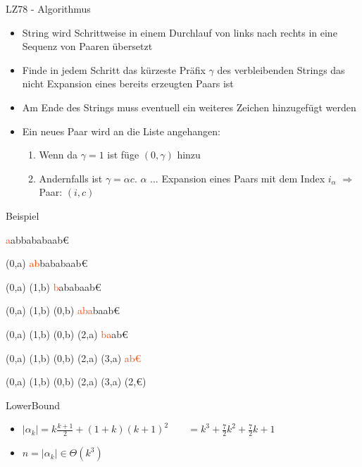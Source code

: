 \begin{frame}{\FrameName}
\begin{block}{LZ78 - Algorithmus}
	\begin{itemize}[<+->]
		\item String wird Schrittweise in einem Durchlauf von links nach rechts in eine Sequenz von Paaren übersetzt
		\item Finde in jedem Schritt das kürzeste Präfix $\gamma$ des verbleibenden Strings das nicht Expansion eines bereits erzeugten Paars ist
		\item Am Ende des Strings muss eventuell ein weiteres Zeichen hinzugefügt werden
		\item Ein neues Paar wird an die Liste angehangen:
		\begin{enumerate}
			\item<4-> Wenn da $\gamma = 1$ ist füge $(0,\gamma)$ hinzu
			\item<5-> Andernfalls ist $\gamma = \alpha c$. \linebreak $\alpha$ ... Expansion eines Paars mit dem Index $i_\alpha$ \linebreak $\Rightarrow$ Paar: $(i,c)$
		\end{enumerate}
	\end{itemize}
\end{block}
\end{frame}

\newcommand{\M}[1]{\textcolor{OrangeRed}{#1}}

\begin{frame}{\FrameName}
\begin{block}{Beispiel}
	\begin{description}[<+->]
		\item \M{a}abbababaab\euro
		\item (0,a) \M{ab}bababaab\euro
		\item (0,a) (1,b) \M{b}ababaab\euro
		\item (0,a) (1,b) (0,b) \M{aba}baab\euro
		\item (0,a) (1,b) (0,b) (2,a) \M{ba}ab\euro
		\item (0,a) (1,b) (0,b) (2,a) (3,a) \M{ab\euro}
		\item (0,a) (1,b) (0,b) (2,a) (3,a) (2,\euro)
	\end{description}
\end{block}
\end{frame}

\begin{frame}{\FrameName}
\begin{block}{LowerBound}
	\begin{center}
	\end{center}
	\begin{itemize}[<+->]
		\item $|\alpha_k | = k \frac{k+1}{2} + (1+k)(k+1)^2$ \linebreak
			$\phantom{|\alpha_k |} = k^3 + \frac{7}{2}k^2 + \frac{7}{2}k + 1$
		\item $ n = |\alpha_k | \in \Theta(k^3)$
	\end{itemize}
\end{block}
\end{frame}

